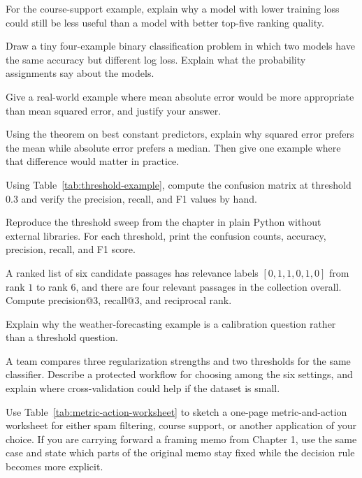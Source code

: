 \begin{exercises}
\item For the course-support example, explain why a model with lower training loss could still be less useful than a model with better top-five ranking quality.
\item Draw a tiny four-example binary classification problem in which two models have the same accuracy but different log loss. Explain what the probability assignments say about the models.
\item Give a real-world example where mean absolute error would be more appropriate than mean squared error, and justify your answer.
\item Using the theorem on best constant predictors, explain why squared error prefers the mean while absolute error prefers a median. Then give one example where that difference would matter in practice.
\item Using Table~\ref{tab:threshold-example}, compute the confusion matrix at threshold $0.3$ and verify the precision, recall, and F1 values by hand.
\item Reproduce the threshold sweep from the chapter in plain Python without external libraries. For each threshold, print the confusion counts, accuracy, precision, recall, and F1 score.
\item A ranked list of six candidate passages has relevance labels $[0,1,1,0,1,0]$ from rank $1$ to rank $6$, and there are four relevant passages in the collection overall. Compute precision@3, recall@3, and reciprocal rank.
\item Explain why the weather-forecasting example is a calibration question rather than a threshold question.
\item A team compares three regularization strengths and two thresholds for the same classifier. Describe a protected workflow for choosing among the six settings, and explain where cross-validation could help if the dataset is small.
\item Use Table~\ref{tab:metric-action-worksheet} to sketch a one-page metric-and-action worksheet for either spam filtering, course support, or another application of your choice. If you are carrying forward a framing memo from Chapter 1, use the same case and state which parts of the original memo stay fixed while the decision rule becomes more explicit.
\end{exercises}

